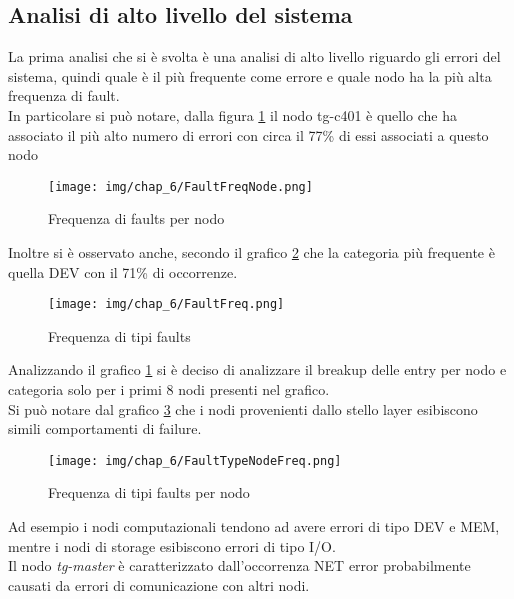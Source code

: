 \subsection{Analisi di alto livello del sistema}
La prima analisi che si è svolta è una analisi di alto livello riguardo gli errori del sistema, quindi quale è il più frequente come errore e quale nodo ha la più alta frequenza di fault.\\
In particolare si può notare, dalla figura \ref{fig:freqFaultNode} il nodo tg-c401 è quello che ha associato il più alto numero di errori con circa il 77\% di essi associati a questo nodo 
\begin{figure}[H]
    \centering
    \texttt{[image: img/chap\_6/FaultFreqNode.png]}
    \caption{Frequenza di faults per nodo}
    \label{fig:freqFaultNode}
\end{figure}
\noindent
Inoltre si è osservato anche, secondo il grafico \ref{fig:freqFauls} che la categoria più frequente è quella DEV con il 71\% di occorrenze.
\begin{figure}[H]
    \centering
    \texttt{[image: img/chap\_6/FaultFreq.png]}
    \caption{Frequenza di tipi faults}
    \label{fig:freqFauls}
\end{figure}
\noindent
Analizzando il grafico \ref{fig:freqFaultNode} si è deciso di analizzare il breakup delle entry per nodo e categoria solo per i primi 8 nodi presenti nel grafico.\\
Si può notare dal grafico \ref{fig:freqFaulsTypeNode} che i nodi provenienti dallo stello layer esibiscono simili comportamenti di failure.
\begin{figure}[H]
    \centering
    \texttt{[image: img/chap\_6/FaultTypeNodeFreq.png]}
    \caption{Frequenza di tipi faults per nodo}
    \label{fig:freqFaulsTypeNode}
\end{figure}
\noindent
Ad esempio i nodi computazionali tendono ad avere errori di tipo DEV e MEM, mentre i nodi di storage esibiscono errori di tipo I/O.\\
Il nodo \textit{tg-master} è caratterizzato dall'occorrenza NET error probabilmente causati da errori di comunicazione con altri nodi.\\

